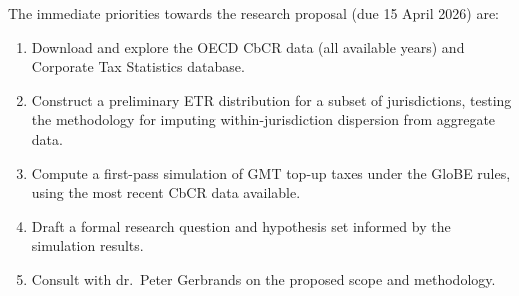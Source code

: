 \documentclass[12pt,a4paper]{article}
\begin{document}
The immediate priorities towards the research proposal (due 15 April 2026) are:

\begin{enumerate}
    \item Download and explore the OECD CbCR data (all available years) and Corporate Tax Statistics database.
    \item Construct a preliminary ETR distribution for a subset of jurisdictions, testing the methodology for imputing within-jurisdiction dispersion from aggregate data.
    \item Compute a first-pass simulation of GMT top-up taxes under the GloBE rules, using the most recent CbCR data available.
    \item Draft a formal research question and hypothesis set informed by the simulation results.
    \item Consult with dr.\ Peter Gerbrands on the proposed scope and methodology.
\end{enumerate}


\printbibliography
\end{document}
